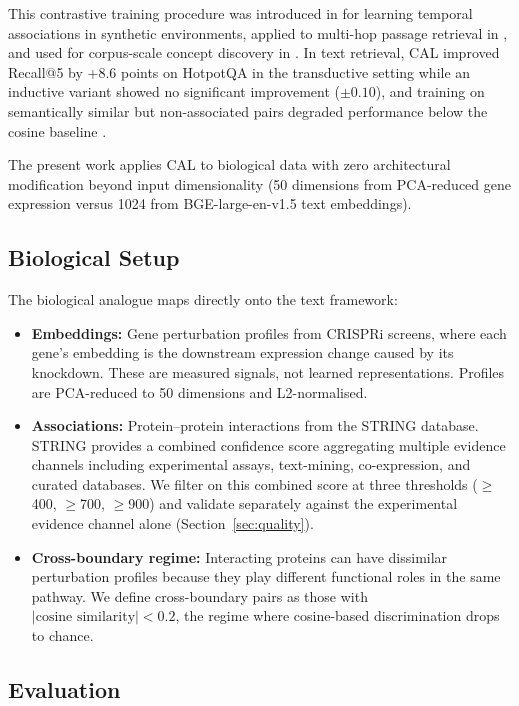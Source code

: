 \documentclass[11pt]{article}
\begin{document}
This contrastive training procedure was introduced in \citet{dury2026pam} for learning temporal associations in synthetic environments, applied to multi-hop passage retrieval in \citet{dury2026aar}, and used for corpus-scale concept discovery in \citet{dury2026concepts}. In text retrieval, CAL improved Recall@5 by +8.6 points on HotpotQA in the transductive setting while an inductive variant showed no significant improvement ($\pm 0.10$), and training on semantically similar but non-associated pairs degraded performance below the cosine baseline \citep{dury2026aar}.

The present work applies CAL to biological data with zero architectural modification beyond input dimensionality (50 dimensions from PCA-reduced gene expression versus 1024 from BGE-large-en-v1.5 text embeddings).

\subsection{Biological Setup}
\label{sec:bio_setup}

The biological analogue maps directly onto the text framework:

\begin{itemize}
    \item \textbf{Embeddings:} Gene perturbation profiles from CRISPRi screens, where each gene's embedding is the downstream expression change caused by its knockdown. These are measured signals, not learned representations. Profiles are PCA-reduced to 50 dimensions and L2-normalised.
    \item \textbf{Associations:} Protein--protein interactions from the STRING database. STRING provides a combined confidence score aggregating multiple evidence channels including experimental assays, text-mining, co-expression, and curated databases. We filter on this combined score at three thresholds ($\geq$400, $\geq$700, $\geq$900) and validate separately against the experimental evidence channel alone (Section~\ref{sec:quality}).
    \item \textbf{Cross-boundary regime:} Interacting proteins can have dissimilar perturbation profiles because they play different functional roles in the same pathway. We define cross-boundary pairs as those with $|\text{cosine similarity}| < 0.2$, the regime where cosine-based discrimination drops to chance.
\end{itemize}

\subsection{Evaluation}
\label{sec:evaluation}
\end{document}
